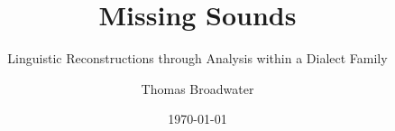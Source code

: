 
\title{Missing Sounds}
\subtitle{Linguistic Reconstructions through Analysis within a Dialect Family}
\author{Thomas Broadwater}
\date{\today}